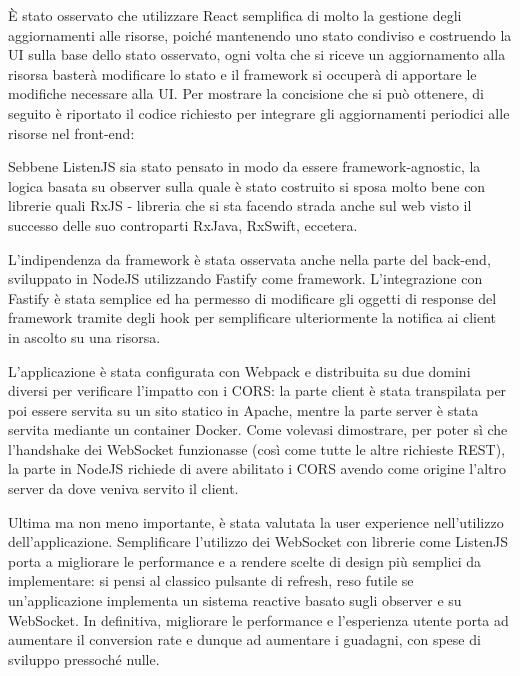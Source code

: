 \documentclass[12pt,a4paper,openright,twoside]{report}
\begin{document}
È stato osservato che utilizzare React semplifica di molto la gestione degli aggiornamenti alle risorse, poiché mantenendo uno stato condiviso e costruendo la UI sulla base dello stato osservato, ogni volta che si riceve un aggiornamento alla risorsa basterà modificare lo stato e il framework si occuperà di apportare le modifiche necessare alla UI. Per mostrare la concisione che si può ottenere, di seguito è riportato il codice richiesto per integrare gli aggiornamenti periodici alle risorse nel front-end:

Sebbene ListenJS sia stato pensato in modo da essere framework-agnostic, la logica basata su observer sulla quale è stato costruito si sposa molto bene con librerie quali RxJS - libreria che si sta facendo strada anche sul web visto il successo delle suo controparti RxJava, RxSwift, eccetera.

\bigskip

L'indipendenza da framework è stata osservata anche nella parte del back-end, sviluppato in NodeJS\cite{nodejs} utilizzando Fastify\cite{fastify} come framework. L'integrazione con Fastify è stata semplice ed ha permesso di modificare gli oggetti di response del framework tramite degli hook per semplificare ulteriormente la notifica ai client in ascolto su una risorsa.


L'applicazione è stata configurata con Webpack\cite{webpack} e distribuita su due domini diversi per verificare l'impatto con i CORS: la parte client è stata transpilata per poi essere servita su un sito statico in Apache, mentre la parte server è stata servita mediante un container Docker. Come volevasi dimostrare, per poter sì che l'handshake dei WebSocket funzionasse (così come tutte le altre richieste REST), la parte in NodeJS richiede di avere abilitato i CORS avendo come origine l'altro server da dove veniva servito il client.

\bigskip

Ultima ma non meno importante, è stata valutata la user experience nell'utilizzo dell'applicazione. Semplificare l'utilizzo dei WebSocket con librerie come ListenJS porta a migliorare le performance e a rendere scelte di design più semplici da implementare: si pensi al classico pulsante di refresh, reso futile se un'applicazione implementa un sistema reactive basato sugli observer e su WebSocket. In definitiva, migliorare le performance e l'esperienza utente porta ad aumentare il conversion rate\cite{why_performance_matters} e dunque ad aumentare i guadagni, con spese di sviluppo pressoché nulle.
\end{document}

